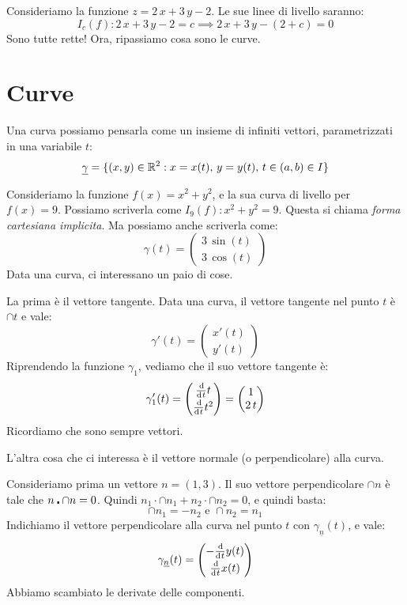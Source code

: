 Consideriamo la funzione $z = 2 \, x + 3 \, y - 2$. Le sue linee di livello saranno: 
\[
        I_{c} (f) : 2 \, x + 3 \, y - 2 = c \implies 2 \, x + 3 \, y - (2 + c) = 0
\]
Sono tutte rette!
Ora, ripassiamo cosa sono le curve.

\section{Curve}

Una curva possiamo pensarla come un insieme di infiniti vettori, parametrizzati in una 
variabile $t$:
\[
        \underline{\gamma} = \{ (x,y) \in \mathbb{R}^2 : x = x(t), \, y = y(t), \, t \in \left( {a}, {b} \right) \in I \}
\]


Consideriamo la funzione $f(x) = x^2 + y^2$, e la sua curva di livello per $f(x) = 9$.
Possiamo scriverla come $I_9(f) : x^2 + y^2 = 9$. Questa si chiama \emph{forma cartesiana implicita}.
Ma possiamo anche scriverla come:
\[
\gamma (t) = \begin{pmatrix} 3 \, \sin(t) \\ 3 \, \cos(t) \end{pmatrix}
\]
Data una curva, ci interessano un paio di cose.

La prima \`e il vettore tangente. Data una curva, il vettore tangente nel punto $t$ \`e $\cap{t}$ e vale:
\[
\gamma'(t) = \begin{pmatrix} x'(t) \\ y'(t) \end{pmatrix}
\]
Riprendendo la funzione $\gamma_1$, vediamo che il suo vettore tangente \`e:
\[
\gamma_1'(t) = \begin{pmatrix} \deriv[t] t \\ \deriv[t] t^2 \end{pmatrix} = 
\begin{pmatrix} 1 \\ 2 \, t \end{pmatrix}
\]
Ricordiamo che sono sempre vettori.

L'altra cosa che ci interessa \`e il vettore normale (o perpendicolare) alla curva.

Consideriamo prima un vettore $n = (1,3)$. Il suo vettore perpendicolare $\cap{n}$ \`e tale che
$n \centerdot \cap{n} = 0$. Quindi $n_1 \cdot \cap{n_1} + n_2 \cdot \cap{n_2} = 0$, e quindi basta:
\[
        \cap{n_1} = - n_2 \text{ e } \cap{n_2} = n_1
\]
Indichiamo il vettore perpendicolare alla curva nel punto $t$ con $\gamma_{\underline{n}}(t)$, e vale:
\[
\gamma_{\underline{n}} (t) = \begin{pmatrix} - \deriv[t] y(t) \\ \deriv[t] x(t) \end{pmatrix}
\]
Abbiamo scambiato le derivate delle componenti.

